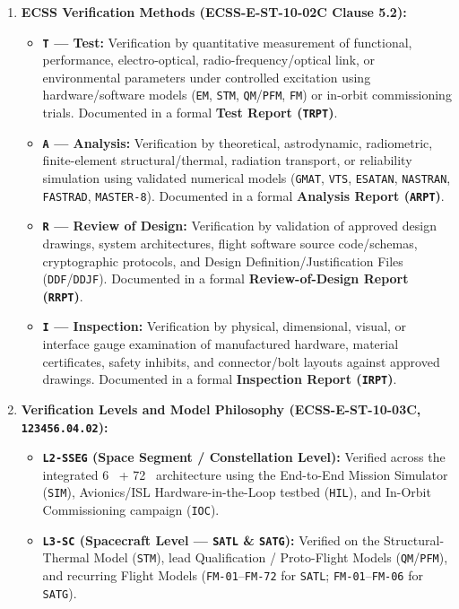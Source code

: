 \begin{enumerate}
    \item \textbf{ECSS Verification Methods (\textbf{ECSS-E-ST-10-02C} Clause 5.2):}
    \begin{itemize}
        \item \textbf{\texttt{T} --- Test:} Verification by quantitative measurement of functional, performance, electro-optical, radio-frequency/optical link, or environmental parameters under controlled excitation using hardware/software models (\texttt{EM}, \texttt{STM}, \texttt{QM}/\texttt{PFM}, \texttt{FM}) or in-orbit commissioning trials. Documented in a formal \textbf{Test Report (\texttt{TRPT})}.
        \item \textbf{\texttt{A} --- Analysis:} Verification by theoretical, astrodynamic, radiometric, finite-element structural/thermal, radiation transport, or reliability simulation using validated numerical models (\texttt{GMAT}, \texttt{VTS}, \texttt{ESATAN}, \texttt{NASTRAN}, \texttt{FASTRAD}, \texttt{MASTER-8}). Documented in a formal \textbf{Analysis Report (\texttt{ARPT})}.
        \item \textbf{\texttt{R} --- Review of Design:} Verification by validation of approved design drawings, system architectures, flight software source code/schemas, cryptographic protocols, and Design Definition/Justification Files (\texttt{DDF}/\texttt{DDJF}). Documented in a formal \textbf{Review-of-Design Report (\texttt{RRPT})}.
        \item \textbf{\texttt{I} --- Inspection:} Verification by physical, dimensional, visual, or interface gauge examination of manufactured hardware, material certificates, safety inhibits, and connector/bolt layouts against approved  drawings. Documented in a formal \textbf{Inspection Report (\texttt{IRPT})}.
    \end{itemize}
    \item \textbf{Verification Levels and Model Philosophy (\textbf{ECSS-E-ST-10-03C},  \texttt{123456.04.02}):}
    \begin{itemize}
        \item \textbf{\texttt{L2-SSEG} (Space Segment / Constellation Level):} Verified across the integrated 6~ + 72~ architecture using the End-to-End Mission Simulator (\texttt{SIM}), Avionics/ISL Hardware-in-the-Loop testbed (\texttt{HIL}), and In-Orbit Commissioning campaign (\texttt{IOC}).
        \item \textbf{\texttt{L3-SC} (Spacecraft Level --- \texttt{SATL} \& \texttt{SATG}):} Verified on the Structural-Thermal Model (\texttt{STM}), lead Qualification / Proto-Flight Models (\texttt{QM}/\texttt{PFM}), and recurring Flight Models (\texttt{FM-01}--\texttt{FM-72} for \texttt{SATL}; \texttt{FM-01}--\texttt{FM-06} for \texttt{SATG}).

\end{itemize}
\end{enumerate}

